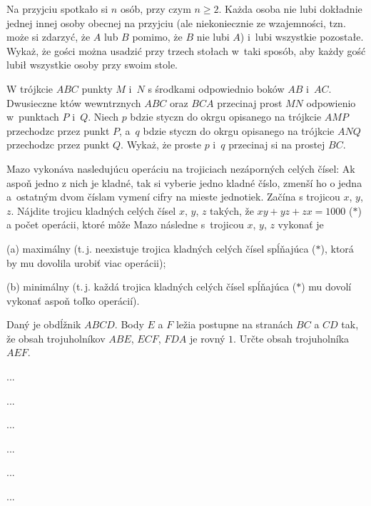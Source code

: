 {%
Na przyj\ę{}ciu spotka\l{}o si\ę{} $n$ osób, przy czym $n\geq 2$. Każda osoba nie lubi dok\l{}adnie jednej innej osoby obecnej na przyj\ę{}ciu (ale niekoniecznie ze wzajemności\ą{}, tzn. może si\ę{} zdarzyć, że $A$ lub $B$ pomimo, że $B$ nie lubi $A$) i~lubi wszystkie pozosta\l{}e. Wykaż, że gości można usadzić przy trzech sto\l{}ach w~taki sposób, aby każdy gość lubi\l{} wszystkie osoby przy swoim stole.}

{%
W trójk\ą{}cie $ABC$ punkty $M$ i~$N$ s\ą{} środkami odpowiednio boków $AB$ i~$AC$. Dwusieczne k\ą{}tów wewn\ę{}trznych $ABC$ oraz $BCA$ przecinaj\ą{} prost\ą{} $MN$ odpowienio w~punktach $P$ i~$Q$. Niech $p$ b\ę{}dzie styczn\ą{} do okr\ę{}gu opisanego na trójk\ą{}cie $AMP$ przechodz\ą{}c\ą{} przez punkt $P$, a~$q$ b\ę{}dzie styczn\ą{} do okr\ę{}gu opisanego na trójk\ą{}cie $ANQ$ przechodz\ą{}c\ą{} przez punkt $Q$. Wykaż, że proste $p$ i~$q$ przecinaj\ą{} si\ę{} na prostej $BC$.}

{%
Mazo vykonáva nasledujúcu operáciu na trojiciach nezáporných celých čísel: Ak aspoň jedno z nich je kladné, tak si vyberie jedno kladné číslo, zmenší ho o jedna a~ostatným dvom číslam vymení cifry na mieste jednotiek. Začína s trojicou $x$, $y$, $z$. Nájdite trojicu kladných celých čísel $x$, $y$, $z$ takých, že
$xy+yz+zx=1000$ ($\ast$) a počet operácii, ktoré môže Mazo následne s~trojicou $x$, $y$, $z$ vykonať je
\item{(a)} maximálny (t.\,j. neexistuje trojica kladných celých čísel spĺňajúca ($\ast$), ktorá by mu dovolila urobiť viac operácii);
\item{(b)} minimálny (t.\,j. každá trojica kladných celých čísel spĺňajúca ($\ast$) mu dovolí vykonať aspoň toľko operácií).\endgraf
}

{%
Daný je obdĺžnik $ABCD$. Body $E$ a $F$ ležia postupne na stranách $BC$ a $CD$ tak, že obsah trojuholníkov $ABE$, $ECF$, $FDA$ je rovný $1$. Určte obsah trojuholníka $AEF$.
}

{%
...}

{%
...}

{%
...}

{%
...}

{%
...}

{%
...}

